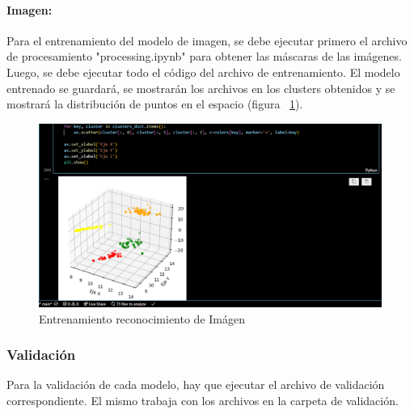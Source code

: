 \documentclass[a4paper, 12pt]{article}
\begin{document}
\paragraph{Imagen:} Para el entrenamiento del modelo de imagen, se debe ejecutar primero el archivo de procesamiento "processing.ipynb" para obtener las máscaras de las imágenes. Luego, se debe ejecutar todo el código del archivo de entrenamiento. El modelo entrenado se guardará, se mostrarán los archivos en los clusters obtenidos y se mostrará la distribución de puntos en el espacio (figura ~\ref{ENTRENAMIENTO IMAGEN}).

\begin{figure}[!htbp]
    \centering
    \includegraphics[width=\linewidth]{ENTRENAMIENTO_IMAGEN.PNG}
    \caption{Entrenamiento reconocimiento de Imágen}
    \label{ENTRENAMIENTO IMAGEN}
\end{figure}

\subsubsection{Validación}

Para la validación de cada modelo, hay que ejecutar el archivo de validación correspondiente. El mismo trabaja con los archivos en la carpeta de validación. 
\end{document}
